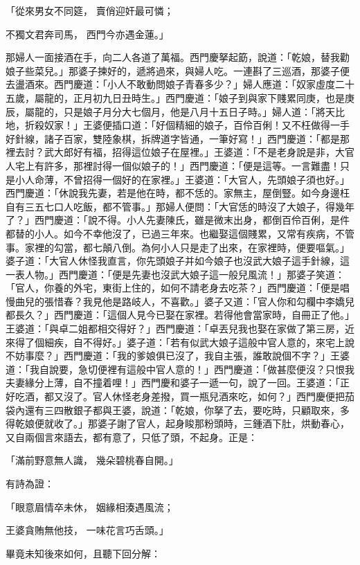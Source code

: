 \begin{showcontents}{}
「從來男女不同筵，  賣俏迎奸最可憐；

不獨文君奔司馬，  西門今亦遇金蓮。」

那婦人一面接酒在手，向二人各道了萬福。西門慶拏起筯，說道：「乾娘，替我勸娘子些菜兒。」那婆子揀好的，遞將過來，與婦人吃。一連斟了三巡酒，那婆子便去盪酒來。西門慶道：「小人不敢動問娘子青春多少？」婦人應道：「奴家虛度二十五歲，屬龍的，正月初九日丑時生。」西門慶道：「娘子到與家下賤累同庚，也是庚辰，屬龍的，只是娘子月分大七個月，他是八月十五日子時。」婦人道：「將天比地，折殺奴家！」王婆便插口道：「好個精細的娘子，百伶百俐！又不枉做得一手好針線，諸子百家，雙陸象棋，拆牌道字皆通，一筆好寫！」西門慶道：「都是那裡去討？武大郎好有福，招得這位娘子在屋裡。」王婆道：「不是老身說是非，大官人宅上有許多，那裡討得一個似娘子的！」西門慶道：「便是這等。一言難盡！只是小人命薄，不曾招得一個好的在家裡。」王婆道：「大官人，先頭娘子須也好。」西門慶道：「休說我先妻，若是他在時，都不恁的。家無主，屋倒豎。如今身邊枉自有三五七口人吃飯，都不管事。」那婦人便問：「大官恁的時沒了大娘子，得幾年了？」西門慶道：「說不得。小人先妻陳氏，雖是微末出身，都倒百伶百俐，是件都替的小人。如今不幸他沒了，已過三年來。也繼娶這個賤累，又常有疾病，不管事。家裡的勾當，都七顛八倒。為何小人只是走了出來，在家裡時，便要嘔氣。」婆子道：「大官人休怪我直言，你先頭娘子并如今娘子也沒武大娘子這手針線，這一表人物。」西門慶道：「便是先妻也沒武大娘子這一般兒風流！」那婆子笑道：「官人，你養的外宅，東街上住的，如何不請老身去吃茶？」西門慶道：「便是唱慢曲兒的張惜春？我見他是路岐人，不喜歡。」婆子又道：「官人你和勾欄中李嬌兒都長久？」西門慶道：「這個人見今已娶在家裡。若得他會當家時，自冊正了他。」王婆道：「與卓二姐都相交得好？」西門慶道：「卓丟兒我也娶在家做了第三房，近來得了個細疾，自不得好。」婆子道：「若有似武大娘子這般中官人意的，來宅上說不妨事麼？」西門慶道：「我的爹娘俱已沒了，我自主張，誰敢說個不字？」王婆道：「我自說要，急切便裡有這般中官人意的！」西門慶道：「做甚麼便沒？只恨我夫妻緣分上薄，自不撞着哩！」西門慶和婆子一遞一句，說了一回。王婆道：「正好吃酒，都又沒了。官人休怪老身差撥，買一瓶兒酒來吃，如何？」西門慶便把茄袋內還有三四散銀子都與王婆，說道：「乾娘，你拏了去，要吃時，只顧取來，多得乾娘便就收了。」那婆子謝了官人，起身睃那粉頭時，三鍾酒下肚，烘動春心，又自兩個言來語去，都有意了，只低了頭，不起身。正是：

「滿前野意無人識，  幾朵碧桃春自開。」

有詩為證：

「眼意眉情卒未休，  姻緣相湊遇風流；

王婆貪賄無他技，  一味花言巧舌頭。」

畢竟未知後來如何，且聽下回分解：





\end{showcontents}

